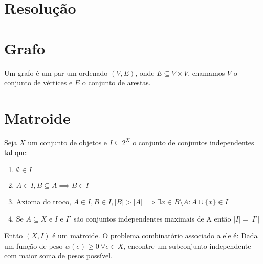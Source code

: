 \section{Resolução}


\section{Grafo}
Um grafo é um par um ordenado $(V, E)$, onde $E \subseteq V\times V$, chamamos $V$ o conjunto de vértices e $E$ o conjunto de arestas.

\section{Matroide}
Seja $X$ um conjunto de objetos e $I \subseteq 2^X$ o conjunto de conjuntos independentes tal que:
\begin{enumerate}
\item $\emptyset \in I$
\item $A \in I, B \subseteq A \implies B \in I$
\item Axioma do troco, $A \in I, B \in I, |B| > |A| \implies \exists x \in B \setminus A : A \cup \{x\} \in I$
\item Se $A \subseteq X$ e $I$ e $I'$ são conjuntos independentes maximais de A então $|I| = |I'|$
\end{enumerate}
Então $(X, I)$ é um matroide. O problema combinatório associado a ele é: Dada um função de peso $w(e) \geq 0 ~\forall e \in X$, encontre um subconjunto independente com maior soma de pesos possível.
